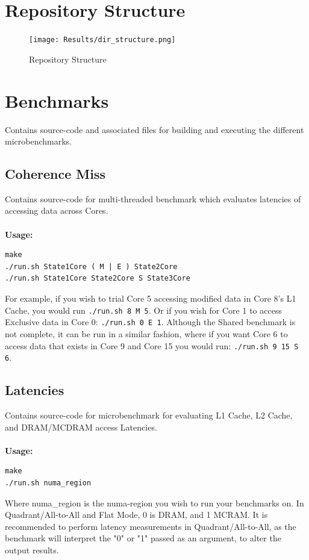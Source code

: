 \documentclass[bsc,frontabs,twoside,singlespacing,parskip,deptreport]{infthesis}     %
\begin{document}
\section{Repository Structure}

\begin{figure}[!h]
    \centering
    \texttt{[image: Results/dir\_structure.png]}
    \caption{Repository Structure}
    \label{fig:repo-struct}
\end{figure}


\section{Benchmarks}
Contains source-code and associated files for building and executing the different microbenchmarks.

\subsection{Coherence Miss}
Contains source-code for multi-threaded benchmark which evaluates latencies of accessing data across Cores. \\
\\
\textbf{Usage:}
\begin{verbatim}
make
./run.sh State1Core ( M | E ) State2Core
./run.sh State1Core State2Core S State3Core
\end{verbatim}

For example, if you wish to trial Core 5 accessing modified data in Core 8's L1 Cache, you would run \texttt{./run.sh 8 M 5}. Or if you wish for Core 1 to access Exclusive data in Core 0: \texttt{./run.sh 0 E 1}. Although the Shared benchmark is not complete, it can be run in a similar fashion, where if you want Core 6 to access data that exists in Core 9 and Core 15 you would run: \texttt{./run.sh 9 15 S 6}.

\subsection{Latencies}
Contains source-code for microbenchmark for evaluating L1 Cache, L2 Cache, and DRAM/MCDRAM access Latencies. \\
\\
\textbf{Usage:}
\begin{verbatim}
make
./run.sh numa_region
\end{verbatim}

Where numa\_region is the numa-region you wish to run your benchmarks on. In Quadrant/All-to-All and Flat Mode, 0 is DRAM, and 1 MCRAM. It is recommended to perform latency measurements in Quadrant/All-to-All, as the benchmark will interpret the "0" or "1" passed as an argument, to alter the output results.
\end{document}
